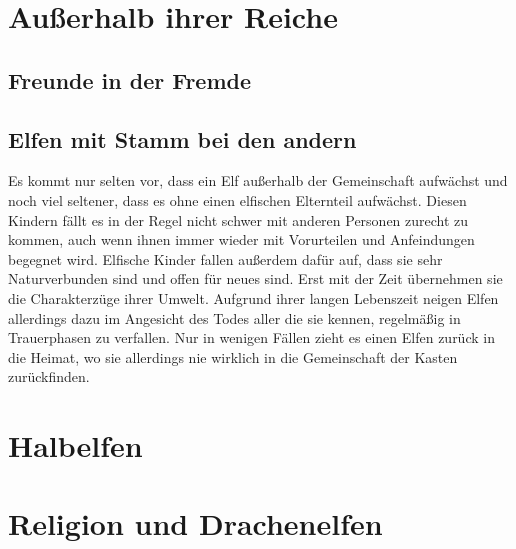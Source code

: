 \documentclass[a4paper,12pt,oneside]{book}
\begin{document}
\part{Außerhalb ihrer Reiche}
\chapter{Freunde in der Fremde}

\chapter{Elfen mit Stamm bei den andern}
Es kommt nur selten vor, dass ein Elf außerhalb der Gemeinschaft aufwächst und noch viel seltener, dass es ohne einen elfischen Elternteil aufwächst. Diesen Kindern fällt es in der Regel nicht schwer mit anderen Personen zurecht zu kommen, auch wenn ihnen immer wieder mit Vorurteilen und Anfeindungen begegnet wird. Elfische Kinder fallen außerdem dafür auf, dass sie sehr Naturverbunden sind und offen für neues sind. Erst mit der Zeit übernehmen sie die Charakterzüge ihrer Umwelt. Aufgrund ihrer langen Lebenszeit neigen Elfen allerdings dazu im Angesicht des Todes aller die sie kennen, regelmäßig in Trauerphasen zu verfallen. Nur in wenigen Fällen zieht es einen Elfen zurück in die Heimat, wo sie allerdings nie wirklich in die Gemeinschaft der Kasten zurückfinden.

\part{Halbelfen}

\part{Religion und Drachenelfen}
\end{document}
